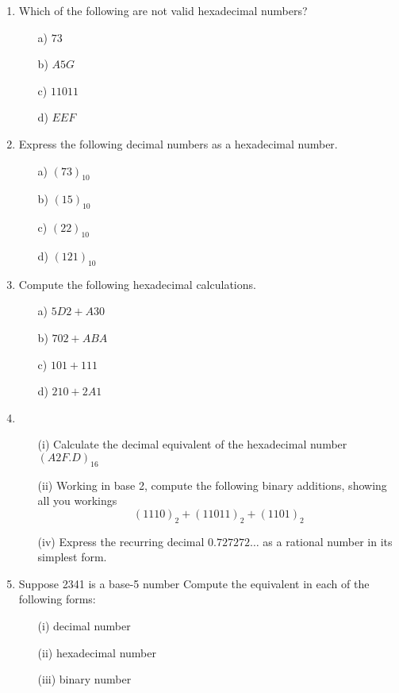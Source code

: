 \documentclass[]{article}
\begin{document}
\begin{enumerate}
\item Which of the following are not valid hexadecimal numbers?
  \begin{multicols}{4}
    \begin{itemize}
    \item[a)] $73$
    \item[b)] $A5G$
    \item[c)] $11011$
    \item[d)] $EEF	$
    \end{itemize}
  \end{multicols}

\item Express the following decimal numbers as a hexadecimal number.
  \begin{multicols}{4}
    \begin{itemize}
    \item[a)] $(73)_{10}$
    \item[b)] $(15)_{10}$
    \item[c)] $(22)_{10}$
    \item[d)] $(121)_{10}$
    \end{itemize}
  \end{multicols}


\item Compute the following hexadecimal calculations.
  \begin{multicols}{4}
    \begin{itemize}
    \item[a)] $5D2+A30$
    \item[b)] $702+ABA$
    \item[c)] $101+111$
    \item[d)] $210+2A1$
    \end{itemize}
  \end{multicols}
\item 
\begin{itemize}
	\item[(i)] Calculate the decimal equivalent of the hexadecimal number $(A2F.D)_{16}$
	\item[(ii)] Working in base 2, compute the following binary additions, showing all you workings
	\[(1110)_2 + (11011)_2 + (1101)_2 \]
	\item[(iv)] Express the recurring decimal $0.727272\ldots$ as a rational number in its simplest form.
\end{itemize}


	\item Suppose 2341 is a base-5 number
	Compute the equivalent in each of the following forms:
	\begin{itemize}
		\item[(i)] decimal number
		\item[(ii)] hexadecimal number
		\item[(iii)] binary number
	\end{itemize}

\end{enumerate}
\end{document}
